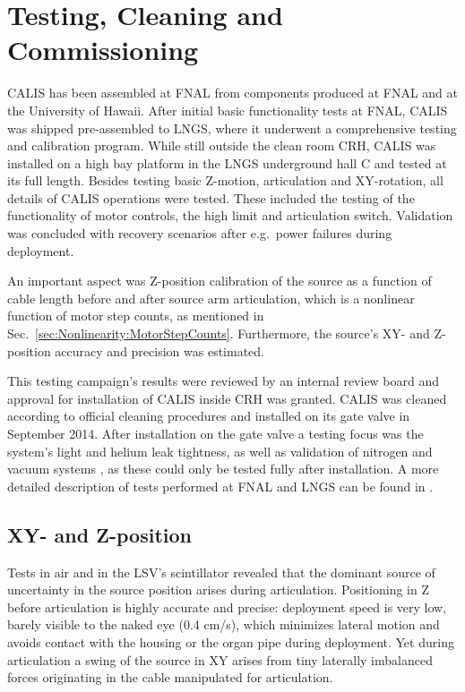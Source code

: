 \section{Testing, Cleaning and Commissioning} \label{sec:Testing}\label{sec:Commissioning}
CALIS has been assembled at FNAL from components produced at FNAL and at the University of Hawaii. After initial basic functionality tests at FNAL, CALIS was shipped pre-assembled to LNGS, where it underwent a comprehensive testing and calibration program. While still outside the clean room CRH, CALIS was installed on a high bay platform in the LNGS underground hall C and tested at its full length. Besides testing basic Z-motion, articulation and XY-rotation, all details of CALIS operations were tested. These included the testing of the functionality of motor controls, the high limit and articulation switch. Validation was concluded with recovery scenarios after e.g.~power failures during deployment.

An important aspect was Z-position calibration of the source as a function of cable length before and after source arm articulation, which is a nonlinear function of motor step counts, as mentioned in Sec.~\ref{sec:Nonlinearity:MotorStepCounts}. Furthermore, the source's XY- and Z-position accuracy and precision was estimated.

This testing campaign's results were reviewed by an internal review board and approval for installation of CALIS inside CRH was granted. CALIS was cleaned according to official cleaning procedures and installed on its gate valve in September 2014.
After installation on the gate valve a testing focus was the system's light and helium leak tightness, as well as validation of nitrogen and vacuum systems , as these could only be tested fully after installation. A more detailed description of tests performed at FNAL and LNGS can be found in \cite{thesis:Hackett, thesis:Edkins}.

\subsection*{XY- and Z-position}
Tests in air and in the LSV's scintillator revealed that the dominant source of uncertainty in the source position arises during articulation. Positioning in Z before articulation is highly accurate and precise: deployment speed is very low, barely visible to the naked eye (0.4 cm/s), which minimizes lateral motion and avoids contact with the housing or the organ pipe during deployment. Yet during articulation a swing of the source in XY arises from tiny laterally imbalanced forces originating in the cable manipulated for articulation. 

